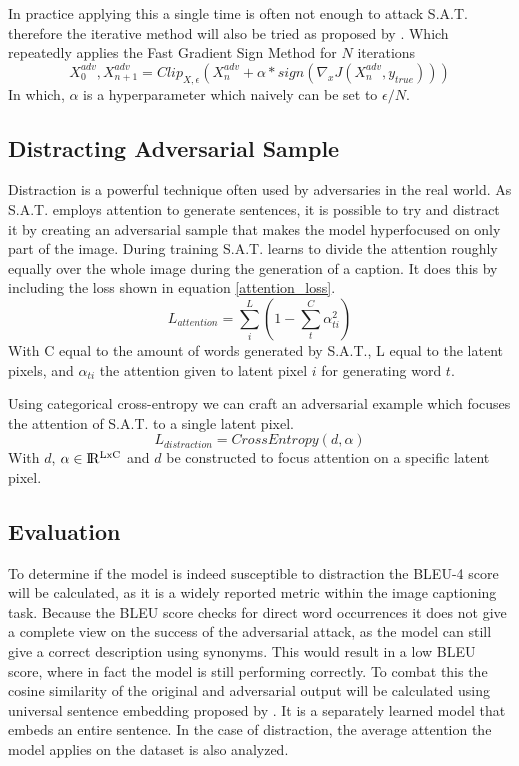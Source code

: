 In practice applying this a single time is often not enough to attack S.A.T. therefore the iterative method will also be tried as proposed by \citeauthor{Kurakin}. Which repeatedly applies the Fast Gradient Sign Method for $N$ iterations
\begin{equation}
    X^{adv}_{0}, X^{adv}_{n + 1} = Clip_{X, \epsilon}(X^{adv}_{n} + \alpha * sign(\nabla_{x}J(X^{adv}_{n}, y_{true})))
    \label{IterativeMethod}
\end{equation}
In which, $\alpha$ is a hyperparameter which naively can be set to $\epsilon / N$.

\subsection*{Distracting Adversarial Sample}
Distraction is a powerful technique often used by adversaries in the real world. As S.A.T. employs attention to generate sentences, it is possible to try and distract it by creating an adversarial sample that makes the model hyperfocused on only part of the image. During training S.A.T. learns to divide the attention roughly equally over the whole image during the generation of a caption. It does this by including the loss shown in equation \ref{attention_loss}.
\begin{equation}
    L_{attention} = \sum^{L}_i (1 - \sum^{C}_{t} \alpha_{ti}^2)
    \label{attention_loss}
\end{equation}
\noindent With C equal to the amount of words generated by S.A.T., L equal to the latent pixels, and $\alpha_{ti}$ the attention given to latent pixel $i$ for generating word $t$.

Using categorical cross-entropy we can craft an adversarial example which focuses the attention of S.A.T. to a single latent pixel.
\begin{equation}
    L_{distraction} = CrossEntropy(d, \alpha)
    \label{distraction_loss}
\end{equation}
With $d$, $\alpha \in \rm I\!R^{LxC}$ and $d$ be constructed to focus attention on a specific latent pixel.

\subsection{Evaluation}
To determine if the model is indeed susceptible to distraction the BLEU-4 score \cite{papineni_roukos_ward_zhu_2001} will be calculated, as it is a widely reported metric within the image captioning task. Because the BLEU score checks for direct word occurrences it does not give a complete view on the success of the adversarial attack, as the model can still give a correct description using synonyms. This would result in a low BLEU score, where in fact the model is still performing correctly. To combat this the cosine similarity of the original and adversarial output will be calculated using universal sentence embedding proposed by \citeauthor{DBLP:journals/corr/abs-1803-11175}. It is a separately learned model that embeds an entire sentence.
In the case of distraction, the average attention the model applies on the dataset is also analyzed.
